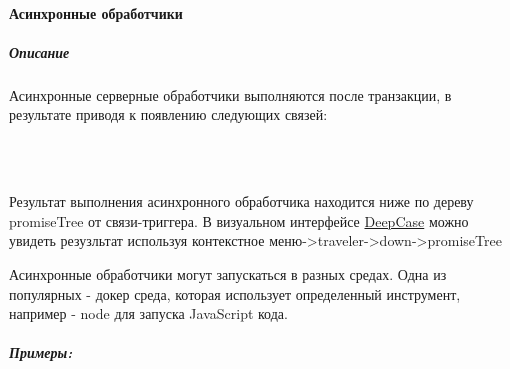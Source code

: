 \documentclass{article}
\begin{document}
\paragraph{Асинхронные обработчики}
\subparagraph{Описание}
Асинхронные серверные обработчики выполняются после транзакции, в результате
приводя к появлению следующих связей: \\
\newenvironment{handler_success_result_info}
{%
  \noindent При успешном выполнении: Связь\textendash триггер \textendash
  Then\textendash > Promise \textendash Resolved\textendash > \\
  PromiseResult {(с object value)}
}
{}
\newenvironment{handler_fail_result_info}
{%
  При ошибке: Связь\textendash триггер \textendash Then\textendash > Promise
  \textendash Rejected\textendash > PromiseResult {(с object value)}
}
{}
\begin{handler_success_result_info}
\end{handler_success_result_info}\\
\begin{handler_fail_result_info}
\end{handler_fail_result_info}\\
Результат выполнения асинхронного обработчика находится ниже по дереву
promiseTree от связи-триггера. В визуальном интерфейсе
\hyperlink{DeepCase.Def}{DeepCase} можно увидеть
резузльтат используя контекстное меню->traveler->down->promiseTree

Асинхронные обработчики могут запускаться в разных средах. Одна из популярных -
докер среда, которая использует определенный инструмент, например - node для
запуска JavaScript кода.
\subparagraph{Примеры:}
\end{document}

